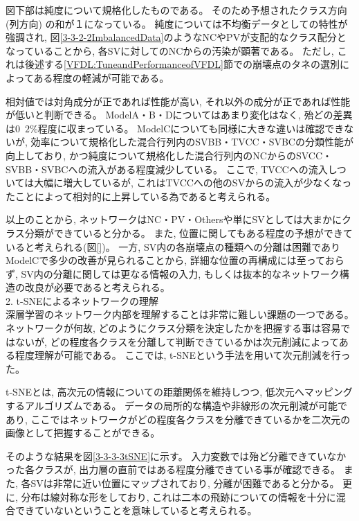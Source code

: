 図下部は純度について規格化したものである。
そのため予想されたクラス方向 (列方向) の和が１になっている。
純度については不均衡データとしての特性が強調され, 図\ref{3-3-2-2ImbalancedData}のようなNCやPVが支配的なクラス配分となっていることから, 各SVに対してのNCからの汚染が顕著である。
ただし, これは後述する\ref{VFDL:TuneandPerformanceofVFDL}節での崩壊点のタネの選別によってある程度の軽減が可能である。

相対値では対角成分が正であれば性能が高い, それ以外の成分が正であれば性能が低いと判断できる。
ModelA・B・Dについてはあまり変化はなく, 殆どの差異は$0$~$2$\%程度に収まっている。
ModelCについても同様に大きな違いは確認できないが, 効率について規格化した混合行列内のSVBB・TVCC・SVBCの分類性能が向上しており, かつ純度について規格化した混合行列内のNCからのSVCC・SVBB・SVBCへの流入がある程度減少している。
ここで, TVCCへの流入しついては大幅に増大しているが, これはTVCCへの他のSVからの流入が少なくなったことによって相対的に上昇している為であると考えられる。

以上のことから, ネットワークはNC・PV・Othersや単にSVとしては大まかにクラス分類ができていると分かる。
また, 位置に関してもある程度の予想ができていると考えられる(図\ref{})。
一方, SV内の各崩壊点の種類への分離は困難でありModelCで多少の改善が見られることから, 詳細な位置の再構成には至っておらず, SV内の分離に関しては更なる情報の入力, もしくは抜本的なネットワーク構造の改良が必要であると考えられる。\\

2. t-SNEによるネットワークの理解\\

深層学習のネットワーク内部を理解することは非常に難しい課題の一つである。
ネットワークが何故, どのようにクラス分類を決定したかを把握する事は容易ではないが, どの程度各クラスを分離して判断できているかは次元削減によってある程度理解が可能である。
ここでは, t-SNEという手法を用いて次元削減を行った。

t-SNEとは, 高次元の情報についての距離関係を維持しつつ, 低次元へマッピングするアルゴリズムである。
データの局所的な構造や非線形の次元削減が可能であり, ここではネットワークがどの程度各クラスを分離できているかを二次元の画像として把握することができる。

そのような結果を図\ref{3-3-3-3tSNE}に示す。
入力変数では殆ど分離できていなかった各クラスが, 出力層の直前ではある程度分離できている事が確認できる。
また, 各SVは非常に近い位置にマップされており, 分離が困難であると分かる。
更に, 分布は線対称な形をしており, これは二本の飛跡についての情報を十分に混合できていないということを意味していると考えられる。

